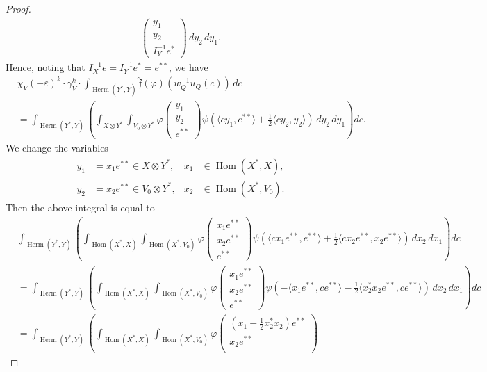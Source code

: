 \documentclass[11pt]{amsart}
\numberwithin{equation}{section}
\theoremstyle{plain}
\theoremstyle{definition}
\theoremstyle{remark}
\def\Herm{\operatorname{Herm}}
\def\Hom{\operatorname{Hom}}
\def\ff{\mathfrak{f}}
\begin{document}
\begin{proof}
\begin{align*}
\begin{pmatrix}
  y_1 \\
  y_2 \\
  I_Y^{-1} e^*
 \end{pmatrix}
 \, dy_2 \, dy_1.
\end{align*}
Hence, noting that $I_X^{-1} e = I_Y^{-1} e^* = e^{**}$, we have
\begin{align*}
 & \chi_V(-\varepsilon)^k \cdot \gamma_V^k \cdot \int_{\Herm(Y^*,Y)} \hat{\ff}(\varphi)(w_Q^{-1} u_Q(c)) \, dc \\
 & = \int_{\Herm(Y^*,Y)} \left( \int_{X \otimes Y^*} \int_{V_0 \otimes Y^*} \varphi
 \begin{pmatrix}
  y_1 \\
  y_2 \\
  e^{**}
 \end{pmatrix}
 \psi (\langle c y_1, e^{**} \rangle + \tfrac{1}{2} \langle cy_2, y_2 \rangle)
 \, dy_2 \, dy_1 \right) dc.
\end{align*}
We change the variables
\begin{align*}
 y_1 & = x_1 e^{**} \in X \otimes Y^*, & x_1 & \in \Hom(X^*,X), \\
 y_2 & = x_2 e^{**} \in V_0 \otimes Y^*, & x_2 & \in \Hom(X^*,V_0).
\end{align*}
Then the above integral is equal to 
\begin{align*}
 & \int_{\Herm(Y^*,Y)} \left( \int_{\Hom(X^*,X)} \int_{\Hom(X^*,V_0)} \varphi
 \begin{pmatrix}
  x_1 e^{**} \\
  x_2 e^{**} \\
  e^{**}
 \end{pmatrix}
 \psi (\langle c x_1 e^{**}, e^{**} \rangle + \tfrac{1}{2} \langle c x_2 e^{**}, x_2 e^{**} \rangle)
 \, dx_2 \, dx_1 \right) dc \\
 & = \int_{\Herm(Y^*,Y)} \left( \int_{\Hom(X^*,X)} \int_{\Hom(X^*,V_0)} \varphi
 \begin{pmatrix}
  x_1 e^{**} \\
  x_2 e^{**} \\
  e^{**}
 \end{pmatrix}
 \psi (-\langle x_1 e^{**}, c e^{**} \rangle - \tfrac{1}{2} \langle x_2^* x_2 e^{**}, c e^{**} \rangle)
 \, dx_2 \, dx_1 \right) dc \\
 & = \int_{\Herm(Y^*,Y)} \left( \int_{\Hom(X^*,X)} \int_{\Hom(X^*,V_0)} \varphi
 \begin{pmatrix}
  (x_1 - \tfrac{1}{2} x_2^* x_2) e^{**} \\
  x_2 e^{**} \\

\end{pmatrix}
\end{align*}
\end{proof}
\end{document}
